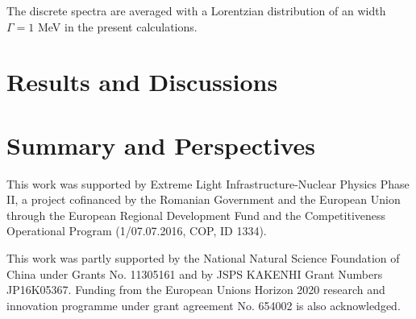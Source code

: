 \documentclass[aps,preprint,showpacs,superscriptaddress,floatfix]{revtex4-1} %
\begin{document}
The discrete spectra are averaged with a Lorentzian distribution of an width $\Gamma = 1 $ MeV in the present calculations.




\section{Results and Discussions}
\label{results}



\section{Summary and Perspectives}
\label{summary}

{}
This work was supported by Extreme Light Infrastructure-Nuclear
Physics Phase II, a project cofinanced by the Romanian Government
and the European Union through the European Regional Development
Fund and the Competitiveness Operational Program (1/07.07.2016,
COP, ID 1334).

This work was partly supported by the National Natural Science Foundation of China
under Grants No. 11305161 and by JSPS KAKENHI Grant Numbers JP16K05367.
Funding from the European Unions Horizon 2020 research and innovation
programme under grant agreement No. 654002 is also
acknowledged.

\clearpage

\end{document}
